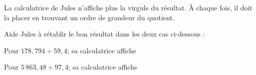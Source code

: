 La calculatrice de Jules n'affiche plus la virgule du résultat. \`A chaque fois, il doit la placer en trouvant un ordre de grandeur du quotient.
\par Aide Jules à rétablir le bon résultat dans les deux cas ci-dessous :
\begin{myenumerate}
  \item Pour $178,794\div59,4$; sa calculatrice affiche 
  \item Pour $5\,863,48\div97,4$; sa calculatrice affiche 
\end{myenumerate}